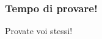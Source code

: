 \begin{frame}
 
  \frametitle{Tempo di provare!}
  
  \begin{center}
    \Huge Provate voi stessi!
  \end{center}

  
\end{frame}
 

